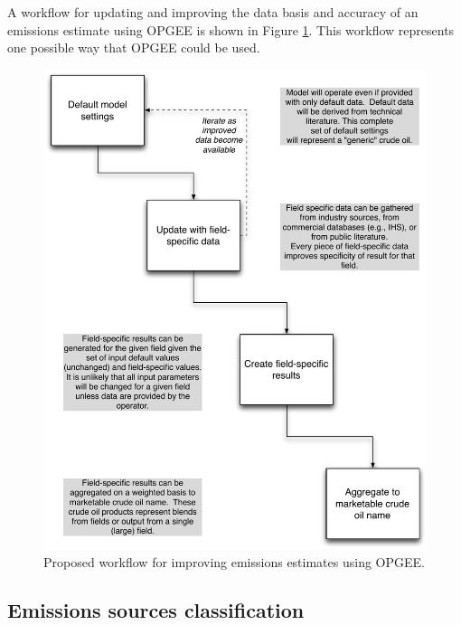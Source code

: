 \documentclass[11pt]{report}
\begin{document}
A workflow for updating and improving the data basis and accuracy of an emissions estimate using OPGEE is shown in Figure \ref{fig:OPGEE_flow}. This workflow represents one possible way that OPGEE could be used.


\begin{figure}[t]
\includegraphics[width=0.8\columnwidth]{images/Flow_chart.pdf}
\caption{Proposed workflow for improving emissions estimates using OPGEE.}
\label{fig:OPGEE_flow}
\end{figure}




\subsection{Emissions sources classification}
\end{document}
